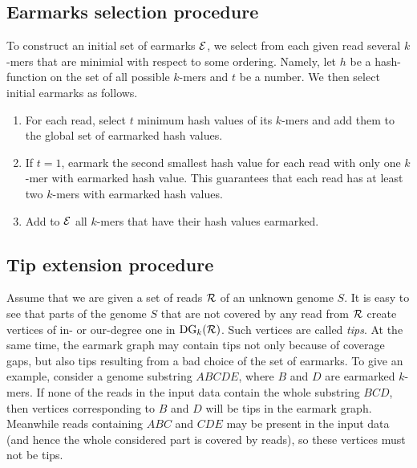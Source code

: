 \documentclass[12pt]{article}
\begin{document}
\subsection{Earmarks selection procedure}
To construct an initial set of earmarks ${\cal E}$, we select from each given read 
several $k$-mers that are minimial with respect to some ordering. Namely, 
let $h$ be a hash-function on the set of all possible $k$-mers and $t$ be a number.
We then select initial earmarks as follows.
\begin{enumerate}
\item For each read, select $t$ minimum hash values of its 
$k$-mers and add them to the global set of earmarked hash values.
\item If $t=1$, earmark the second smallest hash value for each read
with only one $k$-mer with earmarked hash value. This guarantees that each read has at least
two $k$-mers with earmarked hash values.
\item Add to ${\cal E}$ all $k$-mers that have their hash values earmarked.
\end{enumerate}


\subsection{Tip extension procedure}
Assume that we are given a set of reads ${\cal R}$ of an unknown genome $S$.
It is easy to see that parts of the genome $S$ that are not covered by any read
from ${\cal R}$ create vertices of in- or our-degree one in $\textrm{DG}_k({\cal R})$.
Such vertices are called \emph{tips}. At the same time, the earmark graph may contain
tips not only because of coverage gaps, but also tips resulting from a bad choice of the 
set of earmarks. To give an example,
consider a genome substring $ABCDE$, where $B$ and $D$ are earmarked $k$-mers.
If none of the reads in the input data contain the whole substring $BCD$, then vertices corresponding to
$B$ and $D$ will be tips in the earmark graph.
Meanwhile reads containing $ABC$ and $CDE$ may be present in the input data (and hence the whole considered
part is covered by reads), so these vertices must not be tips.
\end{document}
